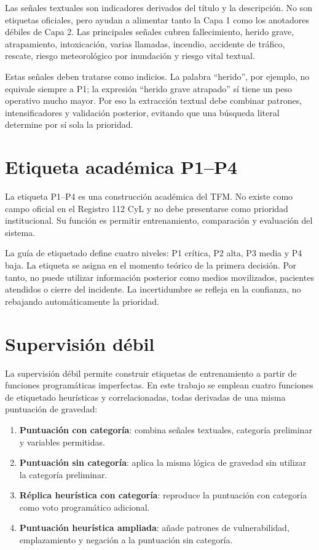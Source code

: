 Las señales textuales son indicadores derivados del título y la descripción. No son etiquetas oficiales, pero ayudan a alimentar tanto la Capa 1 como los anotadores débiles de Capa 2. Las principales señales cubren fallecimiento, herido grave, atrapamiento, intoxicación, varias llamadas, incendio, accidente de tráfico, rescate, riesgo meteorológico por inundación y riesgo vital textual.

Estas señales deben tratarse como indicios. La palabra ``herido'', por ejemplo, no equivale siempre a P1; la expresión ``herido grave atrapado'' sí tiene un peso operativo mucho mayor. Por eso la extracción textual debe combinar patrones, intensificadores y validación posterior, evitando que una búsqueda literal determine por sí sola la prioridad.

\section{Etiqueta académica P1--P4}

La etiqueta P1--P4 es una construcción académica del TFM. No existe como campo oficial en el Registro 112 CyL y no debe presentarse como prioridad institucional. Su función es permitir entrenamiento, comparación y evaluación del sistema.

La guía de etiquetado define cuatro niveles: P1 crítica, P2 alta, P3 media y P4 baja. La etiqueta se asigna en el momento teórico de la primera decisión. Por tanto, no puede utilizar información posterior como medios movilizados, pacientes atendidos o cierre del incidente. La incertidumbre se refleja en la confianza, no rebajando automáticamente la prioridad.

\section{Supervisión débil}

La supervisión débil permite construir etiquetas de entrenamiento a partir de funciones programáticas imperfectas. En este trabajo se emplean cuatro funciones de etiquetado heurísticas y correlacionadas, todas derivadas de una misma puntuación de gravedad:

\begin{enumerate}
    \item \textbf{Puntuación con categoría}: combina señales textuales, categoría preliminar y variables permitidas.
    \item \textbf{Puntuación sin categoría}: aplica la misma lógica de gravedad sin utilizar la categoría preliminar.
    \item \textbf{Réplica heurística con categoría}: reproduce la puntuación con categoría como voto programático adicional.
    \item \textbf{Puntuación heurística ampliada}: añade patrones de vulnerabilidad, emplazamiento y negación a la puntuación sin categoría.
\end{enumerate}


